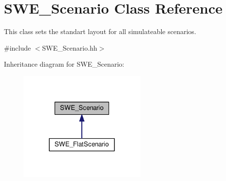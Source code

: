 \hypertarget{classSWE__Scenario}{}\section{S\+W\+E\+\_\+\+Scenario Class Reference}
\label{classSWE__Scenario}


This class sets the standart layout for all simulateable scenarios.  




{\ttfamily \#include $<$S\+W\+E\+\_\+\+Scenario.\+hh$>$}



Inheritance diagram for S\+W\+E\+\_\+\+Scenario\+:\nopagebreak
\begin{figure}[H]
\begin{center}
\leavevmode
\includegraphics[width=180pt]{classSWE__Scenario__inherit__graph}
\end{center}
\end{figure}
